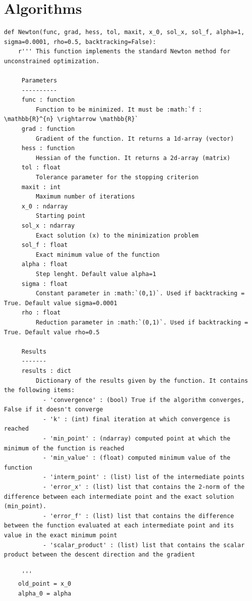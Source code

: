 \documentclass[a4paper,11pt]{article}
\begin{document}
\section{Algorithms}
\begin{verbatim}
def Newton(func, grad, hess, tol, maxit, x_0, sol_x, sol_f, alpha=1, sigma=0.0001, rho=0.5, backtracking=False):
    r''' This function implements the standard Newton method for unconstrained optimization.

     Parameters
     ----------
     func : function
         Function to be minimized. It must be :math:`f : \mathbb{R}^{n} \rightarrow \mathbb{R}`
     grad : function
         Gradient of the function. It returns a 1d-array (vector)
     hess : function
         Hessian of the function. It returns a 2d-array (matrix)
     tol : float
         Tolerance parameter for the stopping criterion
     maxit : int
         Maximum number of iterations
     x_0 : ndarray
         Starting point
     sol_x : ndarray
         Exact solution (x) to the minimization problem
     sol_f : float
         Exact minimum value of the function
     alpha : float
         Step lenght. Default value alpha=1
     sigma : float
         Constant parameter in :math:`(0,1)`. Used if backtracking = True. Default value sigma=0.0001
     rho : float
         Reduction parameter in :math:`(0,1)`. Used if backtracking = True. Default value rho=0.5

     Results
     -------
     results : dict
         Dictionary of the results given by the function. It contains the following items:
           - 'convergence' : (bool) True if the algorithm converges, False if it doesn't converge
           - 'k' : (int) final iteration at which convergence is reached
           - 'min_point' : (ndarray) computed point at which the minimum of the function is reached
           - 'min_value' : (float) computed minimum value of the function
           - 'interm_point' : (list) list of the intermediate points
           - 'error_x' : (list) list that contains the 2-norm of the difference between each intermediate point and the exact solution (min_point). 
           - 'error_f' : (list) list that contains the difference between the function evaluated at each intermediate point and its value in the exact minimum point
           - 'scalar_product' : (list) list that contains the scalar product between the descent direction and the gradient

     '''
    old_point = x_0
    alpha_0 = alpha


\end{verbatim}
\end{document}
